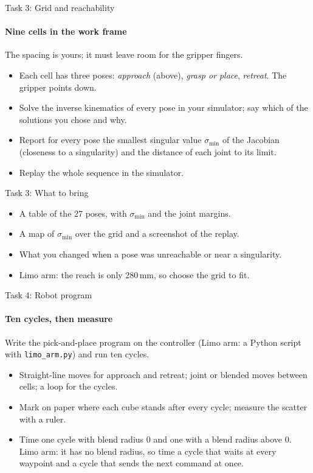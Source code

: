 \documentclass[aspectratio=169]{beamer}
\begin{document}
\begin{frame}[t]{Task 3: Grid and reachability}
\framesubtitle{Nine cells in the work frame}
    The spacing is yours; it must leave room for the gripper fingers.
    \begin{itemize}
        \item Each cell has three poses: \emph{approach} (above), \emph{grasp or place},
              \emph{retreat}. The gripper points down.
        \item Solve the inverse kinematics of every pose in your simulator; say which of the
              solutions you chose and why.
        \item Report for every pose the smallest singular value $\sigma_{\min}$ of the Jacobian
              (closeness to a singularity) and the distance of each joint to its limit.
        \item Replay the whole sequence in the simulator.
    \end{itemize}
\end{frame}

\begin{frame}[t]{Task 3: What to bring}
    \begin{itemize}
        \item A table of the 27 poses, with $\sigma_{\min}$ and the joint margins.
        \item A map of $\sigma_{\min}$ over the grid and a screenshot of the replay.
        \item What you changed when a pose was unreachable or near a singularity.
        \item Limo arm: the reach is only 280\,mm, so choose the grid to fit.
    \end{itemize}
\end{frame}

\begin{frame}[t]{Task 4: Robot program}
\framesubtitle{Ten cycles, then measure}
    Write the pick-and-place program on the controller (Limo arm: a Python script with
    \texttt{limo\_arm.py}) and run ten cycles.
    \begin{itemize}
        \item Straight-line moves for approach and retreat; joint or blended moves between
              cells; a loop for the cycles.
        \item Mark on paper where each cube stands after every cycle; measure the scatter
              with a ruler.
        \item Time one cycle with blend radius $0$ and one with a blend radius above $0$.
              Limo arm: it has no blend radius, so time a cycle that waits at every waypoint
              and a cycle that sends the next command at once.
    \end{itemize}
\end{frame}
\end{document}

